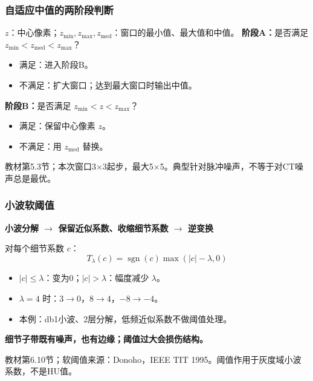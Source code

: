 \documentclass[11pt,aspectratio=169]{beamer}
\newcommand{\key}[1]{{\color{Accent}\bfseries #1}}
\newcommand{\source}[1]{\vfill{\fontsize{7.5}{9}\selectfont\color{Muted}#1\par}}
\begin{document}
\begin{frame}
\frametitle{自适应中值的两阶段判断}
$z$：中心像素；$z_{\min},z_{\max},z_{\mathrm{med}}$：窗口的最小值、最大值和中值。
\vspace{3mm}
\textbf{阶段A：}是否满足 $z_{\min}<z_{\mathrm{med}}<z_{\max}$？
\begin{itemize}
\item 满足：进入阶段B。
\item 不满足：扩大窗口；达到最大窗口时输出中值。
\end{itemize}
\vspace{2mm}
\textbf{阶段B：}是否满足 $z_{\min}<z<z_{\max}$？
\begin{itemize}
\item 满足：保留中心像素 $z$。
\item 不满足：用 $z_{\mathrm{med}}$ 替换。
\end{itemize}
\source{教材第5.3节；本次窗口3×3起步，最大5×5。典型针对脉冲噪声，不等于对CT噪声总是最优。}
\end{frame}

\begin{frame}
\frametitle{小波软阈值}
\textbf{小波分解 $\rightarrow$ 保留近似系数、收缩细节系数 $\rightarrow$ 逆变换}\par
\vspace{3mm}
对每个细节系数 $c$：
\[
T_\lambda(c)=\operatorname{sgn}(c)\max(|c|-\lambda,0)
\]
\begin{itemize}
\item $|c|\le\lambda$：变为0；$|c|>\lambda$：幅度减少 $\lambda$。
\item $\lambda=4$ 时：$3\rightarrow0$，$8\rightarrow4$，$-8\rightarrow-4$。
\item 本例：db1小波、2层分解，低频近似系数不做阈值处理。
\end{itemize}
\vspace{2mm}
\key{细节子带既有噪声，也有边缘；阈值过大会损伤结构。}
\source{教材第6.10节；软阈值来源：Donoho，IEEE TIT 1995。阈值作用于灰度域小波系数，不是HU值。}
\end{frame}
\end{document}
